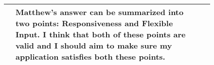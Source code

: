 \documentclass[../../../main.tex]{subfiles}
\begin{document}
\begin{savenotes}
\begin{figure}[H]
\begin{tabular}{|L{0.15\textwidth}|m{0.5\textwidth}|L{0.25\textwidth}|}
		&
		Matthew's answer can be summarized into two points: Responsiveness and Flexible Input. I think that both of these points are valid and I should aim to make sure my application satisfies both these points. \\
		\hline
		\end{tabular}
	
	\end{figure}
\end{savenotes}
\end{document}
